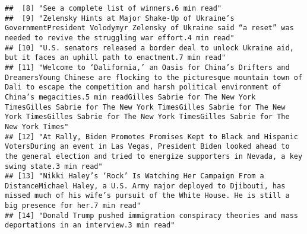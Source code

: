 \documentclass[
]{article}
\begin{document}
\begin{verbatim}
##  [8] "See a complete list of winners.6 min read"                                                                                                                                                                                                                                                                                                                                                                            
##  [9] "Zelensky Hints at Major Shake-Up of Ukraine’s GovernmentPresident Volodymyr Zelensky of Ukraine said “a reset” was needed to revive the struggling war effort.4 min read"                                                                                                                                                                                                                                             
## [10] "U.S. senators released a border deal to unlock Ukraine aid, but it faces an uphill path to enactment.7 min read"                                                                                                                                                                                                                                                                                                      
## [11] "Welcome to ‘Dalifornia,’ an Oasis for China’s Drifters and DreamersYoung Chinese are flocking to the picturesque mountain town of Dali to escape the competition and harsh political environment of China’s megacities.5 min readGilles Sabrie for The New York TimesGilles Sabrie for The New York TimesGilles Sabrie for The New York TimesGilles Sabrie for The New York TimesGilles Sabrie for The New York Times"
## [12] "At Rally, Biden Promotes Promises Kept to Black and Hispanic VotersDuring an event in Las Vegas, President Biden looked ahead to the general election and tried to energize supporters in Nevada, a key swing state.3 min read"                                                                                                                                                                                       
## [13] "Nikki Haley’s ‘Rock’ Is Watching Her Campaign From a DistanceMichael Haley, a U.S. Army major deployed to Djibouti, has missed much of his wife’s pursuit of the White House. He is still a big presence for her.7 min read"                                                                                                                                                                                          
## [14] "Donald Trump pushed immigration conspiracy theories and mass deportations in an interview.3 min read"                                                                                                                                                                                                                                                                                                                 

\end{verbatim}
\end{document}
